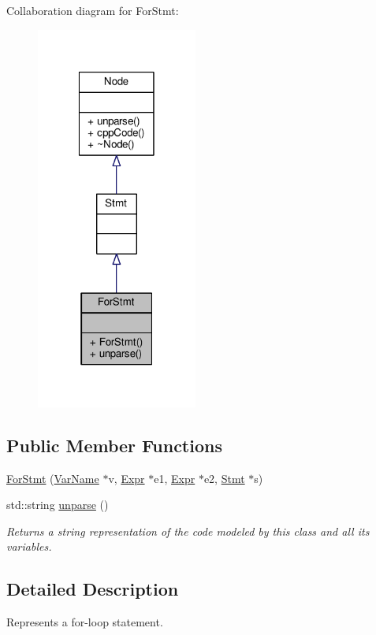Collaboration diagram for For\-Stmt\-:\nopagebreak
\begin{figure}[H]
\begin{center}
\leavevmode
\includegraphics[width=150pt]{classForStmt__coll__graph}
\end{center}
\end{figure}
\subsection*{Public Member Functions}
\begin{DoxyCompactItemize}
\item 
\hyperlink{classForStmt_a2ae00de4dde21c01dab79fa9f53ea747}{For\-Stmt} (\hyperlink{classVarName}{Var\-Name} $\ast$v, \hyperlink{classExpr}{Expr} $\ast$e1, \hyperlink{classExpr}{Expr} $\ast$e2, \hyperlink{classStmt}{Stmt} $\ast$s)
\item 
std\-::string \hyperlink{classForStmt_a9cf08250042ae5a0a54d2196b584e28e}{unparse} ()
\begin{DoxyCompactList}\small\item\em Returns a string representation of the code modeled by this class and all its variables. \end{DoxyCompactList}\end{DoxyCompactItemize}


\subsection{Detailed Description}
Represents a for-\/loop statement. \par
 

